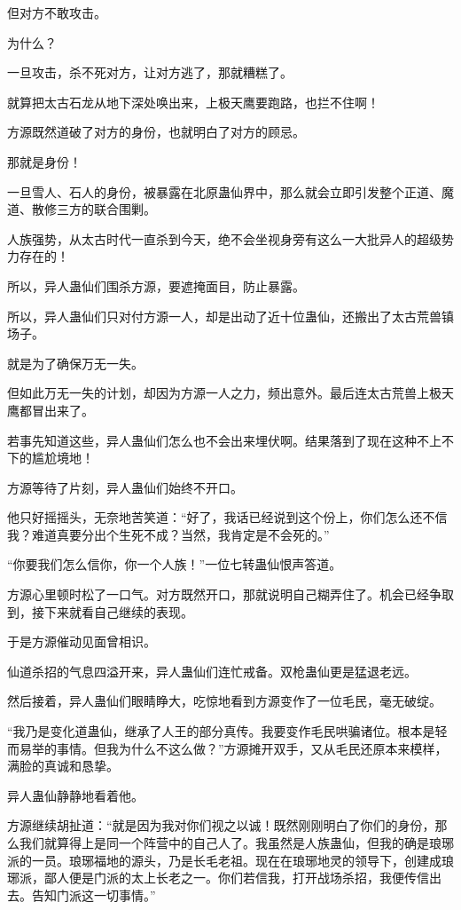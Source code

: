\begin{this_body}
但对方不敢攻击。

为什么？

一旦攻击，杀不死对方，让对方逃了，那就糟糕了。

就算把太古石龙从地下深处唤出来，上极天鹰要跑路，也拦不住啊！

方源既然道破了对方的身份，也就明白了对方的顾忌。

那就是身份！

一旦雪人、石人的身份，被暴露在北原蛊仙界中，那么就会立即引发整个正道、魔道、散修三方的联合围剿。

人族强势，从太古时代一直杀到今天，绝不会坐视身旁有这么一大批异人的超级势力存在的！

所以，异人蛊仙们围杀方源，要遮掩面目，防止暴露。

所以，异人蛊仙们只对付方源一人，却是出动了近十位蛊仙，还搬出了太古荒兽镇场子。

就是为了确保万无一失。

但如此万无一失的计划，却因为方源一人之力，频出意外。最后连太古荒兽上极天鹰都冒出来了。

若事先知道这些，异人蛊仙们怎么也不会出来埋伏啊。结果落到了现在这种不上不下的尴尬境地！

方源等待了片刻，异人蛊仙们始终不开口。

他只好摇摇头，无奈地苦笑道：“好了，我话已经说到这个份上，你们怎么还不信我？难道真要分出个生死不成？当然，我肯定是不会死的。”

“你要我们怎么信你，你一个人族！”一位七转蛊仙恨声答道。

方源心里顿时松了一口气。对方既然开口，那就说明自己糊弄住了。机会已经争取到，接下来就看自己继续的表现。

于是方源催动见面曾相识。

仙道杀招的气息四溢开来，异人蛊仙们连忙戒备。双枪蛊仙更是猛退老远。

然后接着，异人蛊仙们眼睛睁大，吃惊地看到方源变作了一位毛民，毫无破绽。

“我乃是变化道蛊仙，继承了人王的部分真传。我要变作毛民哄骗诸位。根本是轻而易举的事情。但我为什么不这么做？”方源摊开双手，又从毛民还原本来模样，满脸的真诚和恳挚。

异人蛊仙静静地看着他。

方源继续胡扯道：“就是因为我对你们视之以诚！既然刚刚明白了你们的身份，那么我们就算得上是同一个阵营中的自己人了。我虽然是人族蛊仙，但我的确是琅琊派的一员。琅琊福地的源头，乃是长毛老祖。现在在琅琊地灵的领导下，创建成琅琊派，鄙人便是门派的太上长老之一。你们若信我，打开战场杀招，我便传信出去。告知门派这一切事情。”


\end{this_body}

